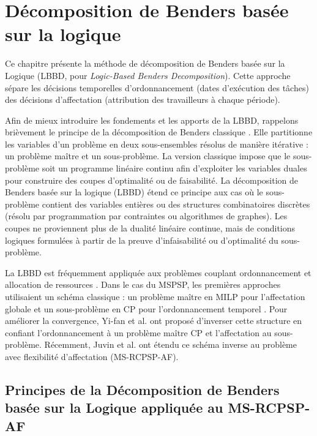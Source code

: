 \section{Décomposition de Benders basée sur la logique}

Ce chapitre présente la méthode de décomposition de Benders basée sur la Logique (LBBD, pour \textit{Logic-Based Benders Decomposition}). Cette approche sépare les décisions temporelles d'ordonnance\-ment (dates d'exécution des tâches) des décisions d'affectation (attribution des travailleurs à chaque période).

\bigskip

Afin de mieux introduire les fondements et les apports de la LBBD, rappelons brièvement le principe de la décomposition de Benders classique \cite{benders1962partitioning}. Elle  partitionne les variables d'un problème en deux sous-ensembles résolus de manière itérative : un problème maître et un sous-problème. La version classique impose que le sous-problème soit un programme linéaire continu afin d'exploiter les variables duales pour construire des coupes d'optimalité ou de faisabilité. La décomposition de Benders basée sur la logique (LBBD) \cite{hooker2000logic, hooker2019logic} étend ce principe aux cas où le sous-problème contient des variables entières ou des structures combinatoires discrètes (résolu par programmation par contraintes ou algorithmes de graphes). Les coupes ne proviennent plus de la dualité linéaire continue, mais de conditions logiques formulées à partir de la preuve d'infaisabilité ou d'optimalité du sous-problème.

\bigskip

La LBBD est fréquemment appliquée aux problèmes couplant ordonnancement et allocation de ressources \cite{cire2016logic}. Dans le cas du MSPSP, les premières approches utilisaient un schéma classique : un problème maître en MILP pour l'affectation globale et un sous-problème en CP pour l'ordonnancement temporel \cite{LiHaitao2009Spwm, li2015benders, nasirian2025multiskilled}. Pour améliorer la convergence, Yi-fan et al. \cite{yi2013new} ont proposé d'inverser cette structure en confiant l'ordonnancement à un problème maître CP et l'affectation au sous-problème. Récemment, Juvin et al. \cite{juvin2026logic} ont étendu ce schéma inverse au problème avec flexibilité d'affectation (MS-RCPSP-AF).


\subsection{Principes de la Décomposition de Benders basée sur la Logique appliquée au MS-RCPSP-AF}

